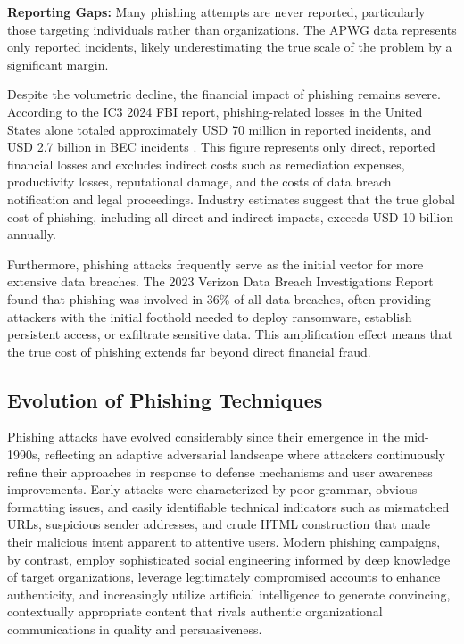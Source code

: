 \textbf{Reporting Gaps:} Many phishing attempts are never reported, particularly those targeting individuals rather than organizations. The APWG data represents only reported incidents, likely underestimating the true scale of the problem by a significant margin.

Despite the volumetric decline, the financial impact of phishing remains severe. According to the \ac{IC3} 2024 \ac{FBI} report, phishing-related losses in the United States alone totaled approximately USD 70 million in reported incidents, and USD 2.7 billion in \ac{BEC} incidents \cite{IC32024}. This figure represents only direct, reported financial losses and excludes indirect costs such as remediation expenses, productivity losses, reputational damage, and the costs of data breach notification and legal proceedings. Industry estimates suggest that the true global cost of phishing, including all direct and indirect impacts, exceeds USD 10 billion annually.

Furthermore, phishing attacks frequently serve as the initial vector for more extensive data breaches. The 2023 Verizon Data Breach Investigations Report found that phishing was involved in 36\% of all data breaches\cite{verizon2023dbir}, often providing attackers with the initial foothold needed to deploy ransomware, establish persistent access, or exfiltrate sensitive data. This amplification effect means that the true cost of phishing extends far beyond direct financial fraud.

\subsection{Evolution of Phishing Techniques}

Phishing attacks have evolved considerably since their emergence in the mid-1990s, reflecting an adaptive adversarial landscape where attackers continuously refine their approaches in response to defense mechanisms and user awareness improvements. Early attacks were characterized by poor grammar, obvious formatting issues, and easily identifiable technical indicators such as mismatched URLs, suspicious sender addresses, and crude \ac{HTML} construction that made their malicious intent apparent to attentive users. Modern phishing campaigns, by contrast, employ sophisticated social engineering informed by deep knowledge of target organizations, leverage legitimately compromised accounts to enhance authenticity, and increasingly utilize artificial intelligence to generate convincing, contextually appropriate content that rivals authentic organizational communications in quality and persuasiveness.

